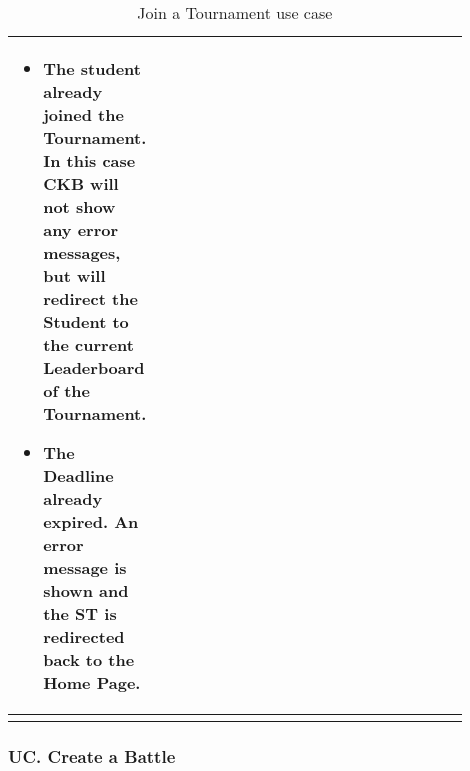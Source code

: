 \begin{center}
\begin{longtable}{|l|p{0.9\linewidth}|}
\begin{itemize}
            \item The student already joined the Tournament. In this case CKB will not show any error messages, but will redirect the Student to the current Leaderboard of the Tournament.
            \item The Deadline already expired. An error message is shown and the ST is redirected back to the Home Page.
        \end{itemize}    \\
        \hline
        \caption{Join a Tournament use case}
        \label{tab: join_a_Tournament_use_case}
    \end{longtable}
\end{center}

\subsubsection*{UC\cuc . Create a Battle}
